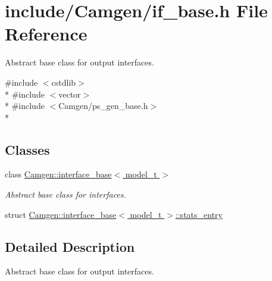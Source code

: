 \hypertarget{a00646}{\section{include/\-Camgen/if\-\_\-base.h File Reference}
\label{a00646}
}


Abstract base class for output interfaces.  


{\ttfamily \#include $<$cstdlib$>$}\\*
{\ttfamily \#include $<$vector$>$}\\*
{\ttfamily \#include $<$Camgen/ps\-\_\-gen\-\_\-base.\-h$>$}\\*
\subsection*{Classes}
\begin{DoxyCompactItemize}
\item 
class \hyperlink{a00313}{Camgen\-::interface\-\_\-base$<$ model\-\_\-t $>$}
\begin{DoxyCompactList}\small\item\em Abstract base class for interfaces. \end{DoxyCompactList}\item 
struct \hyperlink{a00510}{Camgen\-::interface\-\_\-base$<$ model\-\_\-t $>$\-::stats\-\_\-entry}
\end{DoxyCompactItemize}


\subsection{Detailed Description}
Abstract base class for output interfaces. 